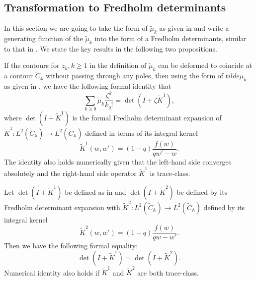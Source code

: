 \subsection{Transformation to Fredholm determinants}
In this section we are going to take the form of $\tilde{\mu}_k$ as given in  and write a generating function of the $\tilde{\mu}_k$ into the form of a Fredholm determinants, similar to that in . We state the key results in the following two propositions.

\begin{proposition}
\label{step-1-cauchy}
If the contours for $z_k, k \ge 1$ in the definition of $\tilde{\mu}_k$ can be deformed to coincide at a contour $\tilde{C}_{\mathbb{A}}$ without passing through any poles, then using the form of $tilde{\mu}_k$ as given in , we have the following formal identity that 
$$\sum_{k \ge 0} \tilde{\mu}_k \frac{\zeta^k}{k_q!} = \det(I+\zeta \tilde{K}^1),$$ where $\det(I+\tilde{K}^1)$ is the formal Fredholm determinant expansion of $\tilde{K}^1: L^2(\tilde{C}_{\mathbb{A}}) \rightarrow L^2(\tilde{C}_{\mathbb{A}})$ defined in terms of its integral kernel $$\tilde{K}^1(w,w') = (1-q) \frac{f(w)}{qw' - w}.$$ The identity also holds numerically given that the left-hand side converges absolutely and the right-hand side operator $\tilde{K}^1$ is trace-class.
\end{proposition}

\begin{proposition}
\label{step-2-cauchy}
Let $\det(I+\tilde{K}^1)$ be defined as in  and $\det(I+\tilde{K}^2)$ be defined by its Fredholm determinant expansion with $\tilde{K}^2: L^2(\tilde{C}_{\mathbb{A}}) \rightarrow L^2(\tilde{C}_{\mathbb{A}})$ defined by its integral kernel $$\tilde{K}^2(w,w') = (1-q) \frac{f(w)}{qw - w'}.$$ Then we have the following formal equality: $$\det(I+\tilde{K}^1) = \det(I+\tilde{K}^2).$$ Numerical identity also holds if $\tilde{K}^1$ and $\tilde{K}^2$ are both trace-class.
\end{proposition}

